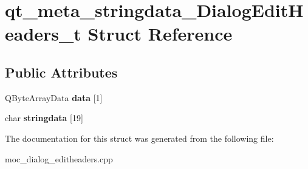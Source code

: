 \hypertarget{structqt__meta__stringdata__DialogEditHeaders__t}{\section{qt\-\_\-meta\-\_\-stringdata\-\_\-\-Dialog\-Edit\-Headers\-\_\-t Struct Reference}
\label{structqt__meta__stringdata__DialogEditHeaders__t}
}
\subsection*{Public Attributes}
\begin{DoxyCompactItemize}
\item 
\hypertarget{structqt__meta__stringdata__DialogEditHeaders__t_a0e1af9b4568a21f4f39bb30bb4decbf3}{Q\-Byte\-Array\-Data {\bfseries data} \mbox{[}1\mbox{]}}\label{structqt__meta__stringdata__DialogEditHeaders__t_a0e1af9b4568a21f4f39bb30bb4decbf3}

\item 
\hypertarget{structqt__meta__stringdata__DialogEditHeaders__t_a5859dc38e5af2d95915f824a955fcadd}{char {\bfseries stringdata} \mbox{[}19\mbox{]}}\label{structqt__meta__stringdata__DialogEditHeaders__t_a5859dc38e5af2d95915f824a955fcadd}

\end{DoxyCompactItemize}


The documentation for this struct was generated from the following file\-:\begin{DoxyCompactItemize}
\item 
moc\-\_\-dialog\-\_\-editheaders.\-cpp\end{DoxyCompactItemize}
